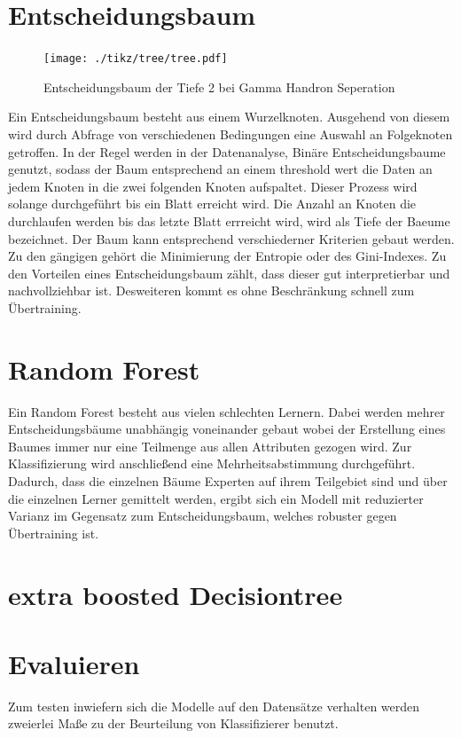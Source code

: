 \section{Entscheidungsbaum}
\begin{figure}
  \centering
  \texttt{[image: ./tikz/tree/tree.pdf]}
  \caption{Entscheidungsbaum der Tiefe 2 bei Gamma Handron Seperation}
\end{figure}
Ein Entscheidungsbaum besteht aus einem Wurzelknoten. Ausgehend von diesem wird durch Abfrage von verschiedenen Bedingungen eine Auswahl an Folgeknoten getroffen. 
In der Regel werden in der Datenanalyse, Binäre Entscheidungsbaume genutzt, sodass der Baum entsprechend an einem threshold wert die Daten an jedem Knoten in die zwei folgenden Knoten aufspaltet. 
Dieser Prozess wird solange durchgeführt bis ein Blatt erreicht wird. 
Die Anzahl an Knoten die durchlaufen werden bis das letzte Blatt errreicht wird, wird als Tiefe der Baeume bezeichnet.
Der Baum kann entsprechend verschiederner Kriterien gebaut werden.
Zu den gängigen gehört die Minimierung der Entropie oder des Gini-Indexes. 
Zu den Vorteilen eines Entscheidungsbaum zählt, dass dieser gut interpretierbar und nachvollziehbar ist. 
Desweiteren kommt es ohne Beschränkung schnell zum Übertraining.
\section{Random Forest}
Ein Random Forest besteht aus vielen schlechten Lernern.
Dabei werden mehrer Entscheidungsbäume unabhängig voneinander gebaut wobei der Erstellung eines Baumes immer nur eine Teilmenge aus allen Attributen gezogen wird.
Zur Klassifizierung wird anschließend eine Mehrheitsabstimmung durchgeführt.
Dadurch, dass die einzelnen Bäume Experten auf ihrem Teilgebiet sind und über die einzelnen Lerner gemittelt werden, ergibt sich ein Modell mit reduzierter Varianz im Gegensatz zum Entscheidungsbaum, welches robuster gegen Übertraining ist.
\section{extra boosted Decisiontree}

\section{Evaluieren}
Zum testen inwiefern sich die Modelle auf den Datensätze verhalten werden zweierlei Maße zu der Beurteilung von Klassifizierer benutzt.
